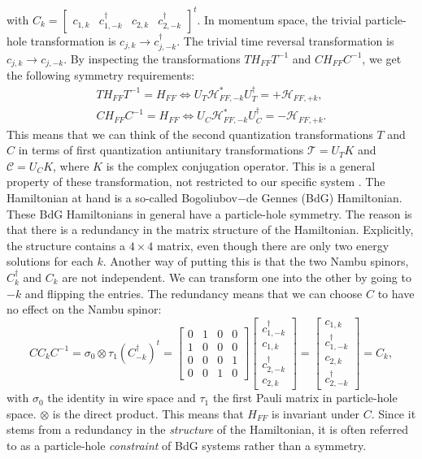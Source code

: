 with $C_k = \begin{bmatrix} c_{1,k} & c^\dagger_{1,-k} & c_{2,k} & c^\dagger_{2,-k} \end{bmatrix}^t$. In momentum space, the trivial particle-hole transformation is $c_{j,k} \to c^\dagger_{j,-k}$. The trivial time reversal transformation is $c_{j,k} \to c_{j,-k}$. By inspecting the transformations $TH_{FF}T^{-1}$ and $CH_{FF}C^{-1}$, we get the following symmetry requirements:
\begin{align}
TH_{FF}T^{-1} = H_{FF} \Leftrightarrow U_T\mathcal{H}^*_{FF,-k} U^\dagger_T = + \mathcal{H}_{FF,+k}, \nonumber \\
CH_{FF}C^{-1} = H_{FF} \Leftrightarrow U_C\mathcal{H}^*_{FF,-k} U^\dagger_C = - \mathcal{H}_{FF,+k}. 
\label{eq.Symmetryrequirements}
\end{align}
This means that we can think of the second quantization transformations $T$ and $C$ in terms of first quantization antiunitary transformations $\mathcal{T} = U_TK$ and $\mathcal{C} = U_CK$, where $K$ is the complex conjugation operator. This is a general property of these transformation, not restricted to our specific system \cite{Ludwig.Topology, Chiu.Topology}. The Hamiltonian at hand is a so-called Bogoliubov$-$de Gennes (BdG) Hamiltonian. These BdG Hamiltonians in general have a particle-hole symmetry. The reason is that there is a redundancy in the matrix structure of the Hamiltonian. Explicitly, the structure contains a $4\times 4$ matrix, even though there are only two energy solutions for each $k$. Another way of putting this is that the two Nambu spinors, $C^\dagger_k$ and $C_k$ are not independent. We can transform one into the other by going to $-k$ and flipping the entries. The redundancy means that we can choose $C$ to have no effect on the Nambu spinor:
\begin{equation}
C C_k C^{-1} =  \sigma_0\otimes \tau_1 (C^\dagger_{-k})^t = \begin{bmatrix} 0 & 1 & 0 & 0 \\ 1 & 0 & 0 & 0 \\ 0 & 0 & 0 & 1 \\ 0 & 0 & 1 & 0 \end{bmatrix} \begin{bmatrix} c^\dagger_{1,-k} \\ c_{1,k} \\ c^\dagger_{2,-k} \\ c_{2,k} \end{bmatrix} = \begin{bmatrix} c_{1,k} \\ c^\dagger_{1,-k} \\ c_{2,k} \\ c^\dagger_{2,-k} \end{bmatrix} = C_k,
\end{equation}
with $\sigma_0$ the identity in wire space and $\tau_1$ the first Pauli matrix in particle-hole space. $\otimes$ is the direct product. This means that $H_{FF}$ is invariant under $C$. Since it stems from a redundancy in the \textit{structure} of the Hamiltonian, it is often referred to as a particle-hole \textit{constraint} of BdG systems rather than a symmetry.

